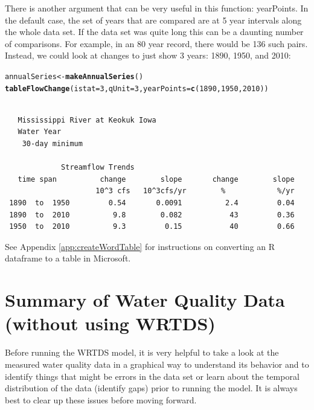 \documentclass[a4paper,11pt]{article}\usepackage{graphicx, color}
\makeatletter
\newcommand{\hlfunctioncall}[1]{\textcolor[rgb]{0.501960784313725,0,0.329411764705882}{\textbf{#1}}}%
\newenvironment{kframe}{%
 \def\at@end@of@kframe{}%
 \ifinner\ifhmode%
  \def\at@end@of@kframe{\end{minipage}}%
  \begin{minipage}{\columnwidth}%
 \fi\fi%
 \def\FrameCommand##1{\hskip\@totalleftmargin \hskip-\fboxsep
 \colorbox{shadecolor}{##1}\hskip-\fboxsep
     \hskip-\linewidth \hskip-\@totalleftmargin \hskip\columnwidth}%
 \MakeFramed {\advance\hsize-\width
   \@totalleftmargin\z@ \linewidth\hsize
   \@setminipage}}%
 {\par\unskip\endMakeFramed%
 \at@end@of@kframe}
\newenvironment{knitrout}{}{} %
\makeatother
\begin{document}
There is another argument that can be very useful in this function: yearPoints.  In the default case, the set of years that are compared are at 5 year intervals along the whole data set.  If the data set was quite long this can be a daunting number of comparisons.  For example, in an 80 year record, there would be 136 such pairs. Instead, we could look at changes to just show 3 years: 1890, 1950, and 2010: 


\begin{knitrout}
\color{fgcolor}\begin{kframe}
\begin{alltt}
annualSeries <- \hlfunctioncall{makeAnnualSeries}()
\hlfunctioncall{tableFlowChange}(istat=3, qUnit=3,yearPoints=\hlfunctioncall{c}(1890,1950,2010))
\end{alltt}
\begin{verbatim}

   Mississippi River at Keokuk Iowa
   Water Year
    30-day minimum 

             Streamflow Trends
   time span          change        slope       change        slope
                     10^3 cfs   10^3cfs/yr        %            %/yr
 1890  to  1950         0.54       0.0091          2.4         0.04
 1890  to  2010          9.8        0.082           43         0.36
 1950  to  2010          9.3         0.15           40         0.66
\end{verbatim}
\end{kframe}
\end{knitrout}


See Appendix \ref{app:createWordTable} for instructions on converting an R dataframe to a table in Microsoft. 

\FloatBarrier


\section{Summary of Water Quality Data (without using WRTDS)}
\label{sec:wqa}
\FloatBarrier

Before running the WRTDS model, it is very helpful to take a look at the measured water quality data in a graphical way to understand its behavior and to identify things that might be errors in the data set or learn about the temporal distribution of the data (identify gaps) prior to running the model.  It is always best to clear up these issues before moving forward.
\end{document}
